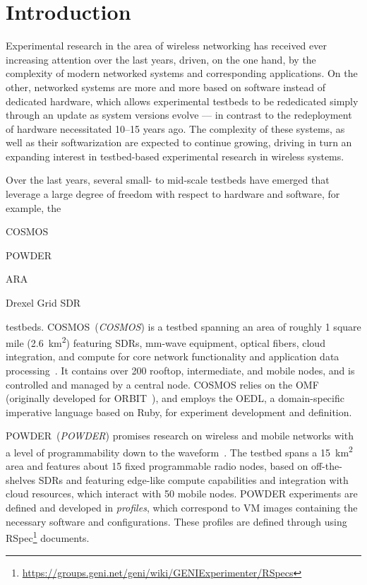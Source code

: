 \section{Introduction}
Experimental research in the area of wireless networking has received ever increasing attention over the last years, driven, on the one hand, by the complexity of modern networked systems and corresponding applications. 
On the other, networked systems are more and more based on software instead of dedicated hardware, which allows experimental testbeds to be rededicated simply through an update as system versions evolve --- in contrast to the redeployment of hardware necessitated \numrange[range-phrase={--}]{10}{15} years ago.
The complexity of these systems, as well as their softwarization are expected to continue growing, driving in turn an expanding interest in testbed-based experimental research in wireless systems.

Over the last years, several small- to mid-scale testbeds have emerged that leverage a large degree of freedom with respect to hardware and software, for example, the 
\begin{enumerate*}[itemjoin={{, }}, itemjoin*={{, and }}]
    \item \acs*{COSMOS}
    \item \acs*{POWDER}
    \item \acs*{ARA}
    \item Drexel Grid \ac{SDR}
\end{enumerate*} testbeds.
\acs{COSMOS}~(\emph{\acl{COSMOS}}) is a testbed spanning an area of roughly \num{1} square mile (\SI{2.6}{\kilo\meter\squared}) featuring \acp{SDR}, \si{\milli\meter}-wave equipment, optical fibers, cloud integration, and compute for core network functionality and application data processing~\cite{Cosmos1,cosmos2}.
It contains over \num{200} rooftop, intermediate, and mobile nodes, and is controlled and managed by a central node.
\ac{COSMOS} relies on the \ac{OMF} (originally developed for ORBIT~\cite{orbit}), and employs the \ac{OEDL}, a domain-specific imperative language based on Ruby, for experiment development and definition.

\acs{POWDER}~(\emph{\acl{POWDER}}) promises research on wireless and mobile networks with a level of programmability down to the waveform~\cite{powder}.
The testbed spans a \SI{15}{\kilo\meter\squared} area and features about \num{15} fixed programmable radio nodes, based on off-the-shelves \acp{SDR} and featuring edge-like compute capabilities and integration with cloud resources, which interact with \num{50} mobile nodes. 
\ac{POWDER} experiments are defined and developed in \emph{profiles}, which correspond to \ac{VM} images containing the necessary software and configurations.
These profiles are defined through using \ac{RSpec}\footnote{\url{https://groups.geni.net/geni/wiki/GENIExperimenter/RSpecs}} documents.

